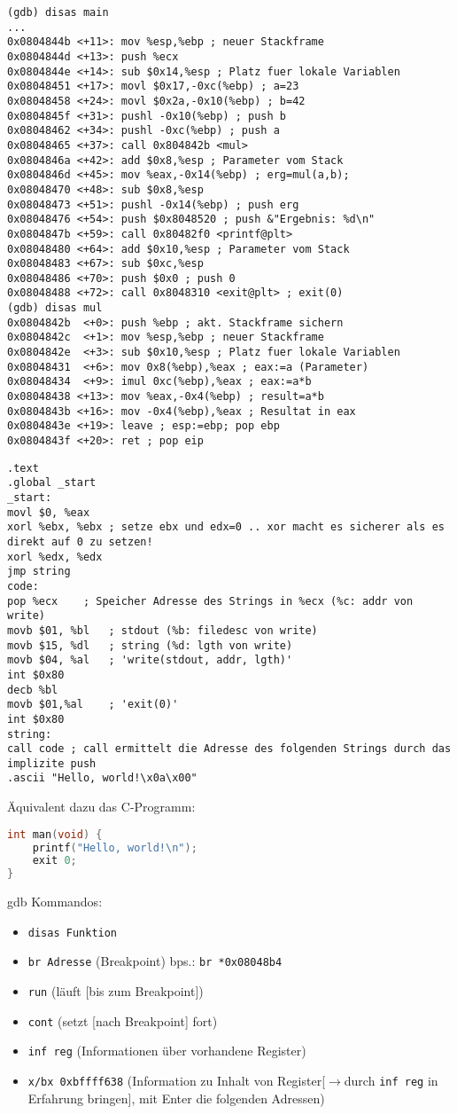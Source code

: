 \begin{lstlisting}[language={[x86masm]Assembler}]
(gdb) disas main
...
0x0804844b <+11>: mov %esp,%ebp ; neuer Stackframe
0x0804844d <+13>: push %ecx
0x0804844e <+14>: sub $0x14,%esp ; Platz fuer lokale Variablen
0x08048451 <+17>: movl $0x17,-0xc(%ebp) ; a=23
0x08048458 <+24>: movl $0x2a,-0x10(%ebp) ; b=42
0x0804845f <+31>: pushl -0x10(%ebp) ; push b
0x08048462 <+34>: pushl -0xc(%ebp) ; push a
0x08048465 <+37>: call 0x804842b <mul>
0x0804846a <+42>: add $0x8,%esp ; Parameter vom Stack
0x0804846d <+45>: mov %eax,-0x14(%ebp) ; erg=mul(a,b);
0x08048470 <+48>: sub $0x8,%esp
0x08048473 <+51>: pushl -0x14(%ebp) ; push erg
0x08048476 <+54>: push $0x8048520 ; push &"Ergebnis: %d\n"
0x0804847b <+59>: call 0x80482f0 <printf@plt>
0x08048480 <+64>: add $0x10,%esp ; Parameter vom Stack
0x08048483 <+67>: sub $0xc,%esp
0x08048486 <+70>: push $0x0 ; push 0
0x08048488 <+72>: call 0x8048310 <exit@plt> ; exit(0)
(gdb) disas mul
0x0804842b 	<+0>: push %ebp ; akt. Stackframe sichern
0x0804842c  <+1>: mov %esp,%ebp ; neuer Stackframe
0x0804842e  <+3>: sub $0x10,%esp ; Platz fuer lokale Variablen
0x08048431  <+6>: mov 0x8(%ebp),%eax ; eax:=a (Parameter)
0x08048434  <+9>: imul 0xc(%ebp),%eax ; eax:=a*b
0x08048438 <+13>: mov %eax,-0x4(%ebp) ; result=a*b
0x0804843b <+16>: mov -0x4(%ebp),%eax ; Resultat in eax
0x0804843e <+19>: leave ; esp:=ebp; pop ebp
0x0804843f <+20>: ret ; pop eip
\end{lstlisting}

\begin{lstlisting}[language={[x86masm]Assembler}]
.text
.global _start
_start:
movl $0, %eax
xorl %ebx, %ebx	; setze ebx und edx=0 .. xor macht es sicherer als es direkt auf 0 zu setzen!
xorl %edx, %edx
jmp string
code:
pop %ecx	; Speicher Adresse des Strings in %ecx (%c: addr von write)
movb $01, %bl	; stdout (%b: filedesc von write)
movb $15, %dl	; string (%d: lgth von write)
movb $04, %al	; 'write(stdout, addr, lgth)'
int $0x80
decb %bl
movb $01,%al	; 'exit(0)'
int $0x80
string:
call code ; call ermittelt die Adresse des folgenden Strings durch das implizite push
.ascii "Hello, world!\x0a\x00"
\end{lstlisting}
Äquivalent dazu das C-Programm:
\begin{lstlisting}[language=C]
int man(void) {
	printf("Hello, world!\n");
	exit 0;
}
\end{lstlisting}


gdb Kommandos:
\begin{itemize}
\item \lstinline`disas Funktion`
\item \lstinline`br Adresse` (Breakpoint) bps.: \lstinline`br *0x08048b4`
\item \lstinline`run` (läuft [bis zum Breakpoint])
\item \lstinline`cont` (setzt [nach Breakpoint] fort)
\item \lstinline`inf reg` (Informationen über vorhandene Register)
\item \lstinline`x/bx 0xbffff638` (Information zu Inhalt von Register[$\to$durch \lstinline`inf reg` in Erfahrung bringen], mit Enter die folgenden Adressen)
\end{itemize}

